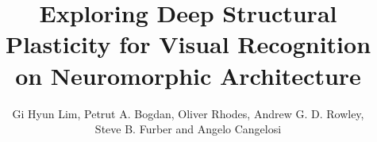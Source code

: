 \documentclass[sigconf]{acmart}
\begin{document}
\title{Exploring Deep Structural Plasticity for Visual Recognition on Neuromorphic Architecture}


\author{Gi Hyun Lim, Petrut A. Bogdan, Oliver Rhodes, Andrew G. D. Rowley, \\
         Steve B. Furber and Angelo Cangelosi}




\renewcommand{\shorttitle}{Exploring Deep Structural Plasticity on Neuromorphic  Architecture}
\renewcommand{\shortauthors}{G.H. Lim et al.}
\end{document}
